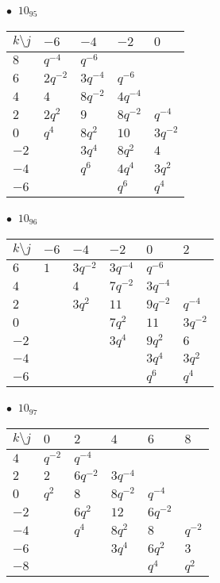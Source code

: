 \begin{minipage}{\linewidth}
$\bullet\ $ $10_{95}$ \vspace{0.5em} \\
\begin{tabular}{l|llll}
$k \setminus j$ & $-6$ & $-4$ & $-2$ & $0$ \\
\hline
$8$ & $q^{-4}$ & $q^{-6}$ &  &  \\
$6$ & $2q^{-2}$ & $3q^{-4}$ & $q^{-6}$ &  \\
$4$ & $4$ & $8q^{-2}$ & $4q^{-4}$ &  \\
$2$ & $2q^{2}$ & $9$ & $8q^{-2}$ & $q^{-4}$ \\
$0$ & $q^{4}$ & $8q^{2}$ & $10$ & $3q^{-2}$ \\
$-2$ &  & $3q^{4}$ & $8q^{2}$ & $4$ \\
$-4$ &  & $q^{6}$ & $4q^{4}$ & $3q^{2}$ \\
$-6$ &  &  & $q^{6}$ & $q^{4}$ \\
\end{tabular}
\vspace{2em}
\end{minipage}
%
\begin{minipage}{\linewidth}
$\bullet\ $ $10_{96}$ \vspace{0.5em} \\
\begin{tabular}{l|lllll}
$k \setminus j$ & $-6$ & $-4$ & $-2$ & $0$ & $2$ \\
\hline
$6$ & $1$ & $3q^{-2}$ & $3q^{-4}$ & $q^{-6}$ &  \\
$4$ &  & $4$ & $7q^{-2}$ & $3q^{-4}$ &  \\
$2$ &  & $3q^{2}$ & $11$ & $9q^{-2}$ & $q^{-4}$ \\
$0$ &  &  & $7q^{2}$ & $11$ & $3q^{-2}$ \\
$-2$ &  &  & $3q^{4}$ & $9q^{2}$ & $6$ \\
$-4$ &  &  &  & $3q^{4}$ & $3q^{2}$ \\
$-6$ &  &  &  & $q^{6}$ & $q^{4}$ \\
\end{tabular}
\vspace{2em}
\end{minipage}
%
\begin{minipage}{\linewidth}
$\bullet\ $ $10_{97}$ \vspace{0.5em} \\
\begin{tabular}{l|lllll}
$k \setminus j$ & $0$ & $2$ & $4$ & $6$ & $8$ \\
\hline
$4$ & $q^{-2}$ & $q^{-4}$ &  &  &  \\
$2$ & $2$ & $6q^{-2}$ & $3q^{-4}$ &  &  \\
$0$ & $q^{2}$ & $8$ & $8q^{-2}$ & $q^{-4}$ &  \\
$-2$ &  & $6q^{2}$ & $12$ & $6q^{-2}$ &  \\
$-4$ &  & $q^{4}$ & $8q^{2}$ & $8$ & $q^{-2}$ \\
$-6$ &  &  & $3q^{4}$ & $6q^{2}$ & $3$ \\
$-8$ &  &  &  & $q^{4}$ & $q^{2}$ \\
\end{tabular}
\vspace{2em}
\end{minipage}
